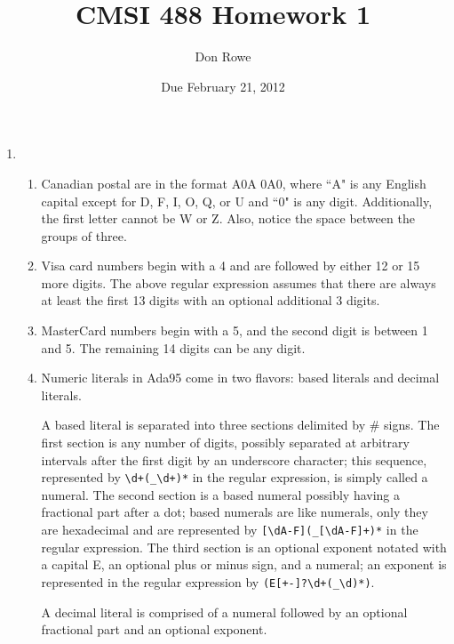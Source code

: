 \documentclass[landscape]{report}
\title{CMSI 488 Homework 1}
\author{Don Rowe}
\date{Due February 21, 2012}
\begin{document}
  \maketitle
  
  \begin{enumerate}
    \item %
    \begin{enumerate}
      \item %
        
        Canadian postal are in the format A0A 0A0, where ``A" is any English
        capital except for D, F, I, O, Q, or U and ``0" is any digit.
        Additionally, the first letter cannot be W or Z. Also, notice the
        space between the groups of three.
      \item %
        
        Visa card numbers begin with a 4 and are followed by either 12 or 15
        more digits. The above regular expression assumes that there are always
        at least the first 13 digits with an optional additional 3 digits.
      \item %
        
        MasterCard numbers begin with a 5, and the second digit is between 1
        and 5. The remaining 14 digits can be any digit.
      \item %
        
        Numeric literals in Ada95 come in two flavors: based literals and
        decimal literals.
        
        A based literal is separated into three sections
        delimited by \# signs. The first section is any number of digits,
        possibly separated at arbitrary intervals after the first digit by an
        underscore character; this sequence, represented by
        \lstinline`\d+(_\d+)*` in the regular expression, is simply called a
        numeral. The second section is a based numeral possibly having a
        fractional part after a dot; based numerals are like numerals, only
        they are hexadecimal and are represented by
        \lstinline`[\dA-F](_[\dA-F]+)*` in the regular expression. The third
        section is an optional exponent notated with a capital E, an optional
        plus or minus sign, and a numeral; an exponent is represented in the
        regular expression by \lstinline`(E[+-]?\d+(_\d)*)`.
        
        A decimal literal is comprised of a numeral followed by an optional
        fractional part and an optional exponent.
    \end{enumerate}
  \end{enumerate}
\end{document}
